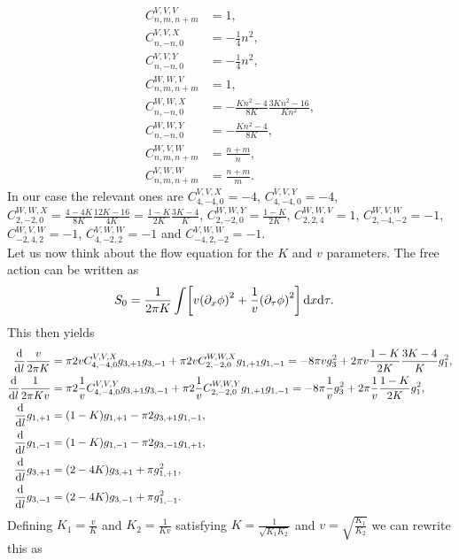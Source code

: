 \documentclass[english, parskip=full]{scrartcl}
\begin{document}
\begin{align}
C^{V,V,V}_{n,m,n+m} &= 1,\\
C^{V,V,X}_{n,-n,0} &= - \frac{1}{4}n^2,\\
C^{V,V,Y}_{n,-n,0} &= - \frac{1}{4}n^2,\\
C^{W,W,V}_{n,m,n+m} &= 1,\\
C^{W,W,X}_{n,-n,0} &= - \frac{Kn^2-4}{8K} \frac{3Kn^2 - 16}{Kn^2},\\
C^{W,W,Y}_{n,-n,0} &= - \frac{Kn^2-4}{8K},\\
C^{W,V,W}_{n,m,n+m} &= \frac{n+m}{n},\\
C^{V,W,W}_{n,m,n+m} &= \frac{n+m}{m}.
\end{align}
In our case the relevant ones are $C^{V,V,X}_{4,-4,0} = -4$, $C^{V,V,Y}_{4,-4,0} = -4$, $C^{W,W,X}_{2,-2,0} = \frac{4 - 4K}{8K} \frac{12K - 16}{4K} = \frac{1 - K}{2K} \frac{3K - 4}{K}$, $C^{W,W,Y}_{2,-2,0} = \frac{1 - K}{2K}$, $C^{W,W,V}_{2,2,4} = 1$, $C^{W,V,W}_{2,-4,-2} = -1$, $C^{W,V,W}_{-2,4,2} = -1$, $C^{V,W,W}_{4,-2,2} = -1$ and $C^{V,W,W}_{-4,2,-2} = -1$.\\
Let us now think about the flow equation for the $K$ and $v$ parameters.
The free action can be written as
\begin{align}
S_0 &= \frac{1}{2\pi K} \int \klb*{ v \kla*{\partial_x\phi}^2 + \frac{1}{v} \kla*{\partial_\tau\phi}^2}\,\d x\d \tau.
\end{align}
This then yields
\begin{align}
\frac{\text{d}}{\text{d} l} \frac{v}{2\pi K} &= \pi 2vC^{V,V,X}_{4,-4,0} g_{3,+1} g_{3,-1} + \pi 2vC^{W,W,X}_{2,-2,0} g_{1,+1} g_{1,-1} = -8\pi v g_3^2 + 2\pi v \frac{1-K}{2K} \frac{3K-4}{K} g_1^2,\\
\frac{\text{d}}{\text{d} l} \frac{1}{2\pi Kv} &= \pi 2 \frac{1}{v}C^{V,V,Y}_{4,-4,0} g_{3,+1} g_{3,-1} + \pi 2\frac{1}{v} C^{W,W,Y}_{2,-2,0} g_{1,+1} g_{1,-1} = -8\pi \frac{1}{v} g_3^2 + 2\pi \frac{1}{v} \frac{1-K}{2K} g_1^2,\\
\frac{\text{d}}{\text{d} l} g_{1,+1} &= (1-K) g_{1,+1} -\pi 2g_{3,+1} g_{1,-1},\\
\frac{\text{d}}{\text{d} l} g_{1,-1} &= (1-K) g_{1,-1} -\pi 2g_{3,-1} g_{1,+1},\\
\frac{\text{d}}{\text{d} l} g_{3,+1} &= (2-4K) g_{3,+1} + \pi g_{1,+1}^2,\\
\frac{\text{d}}{\text{d} l} g_{3,-1} &= (2-4K) g_{3,-1} + \pi g_{1,-1}^2.
\end{align}
Defining $K_1 = \frac{v}{K}$ and $K_2 = \frac{1}{Kv}$ satisfying $K = \frac{1}{\sqrt{K_1K_2}}$ and $v = \sqrt{\frac{K_1}{K_2}}$ we can rewrite this as
\end{document}
